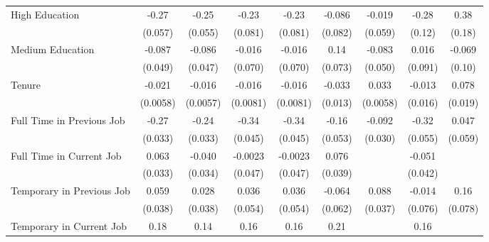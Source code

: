 {\begin{tabular}{l*{8}{c}}
High Education &   -0.27\sym{***}&   -0.25\sym{***}&   -0.23\sym{***}&   -0.23\sym{***}&  -0.086         &  -0.019         &   -0.28\sym{**} &    0.38\sym{**} \\
               & (0.057)         & (0.055)         & (0.081)         & (0.081)         & (0.082)         & (0.059)         &  (0.12)         &  (0.18)         \\
Medium Education&  -0.087\sym{*}  &  -0.086\sym{*}  &  -0.016         &  -0.016         &    0.14\sym{*}  &  -0.083\sym{*}  &   0.016         &  -0.069         \\
               & (0.049)         & (0.047)         & (0.070)         & (0.070)         & (0.073)         & (0.050)         & (0.091)         &  (0.10)         \\
Tenure         &  -0.021\sym{***}&  -0.016\sym{***}&  -0.016\sym{*}  &  -0.016\sym{*}  &  -0.033\sym{**} &   0.033\sym{***}&  -0.013         &   0.078\sym{***}\\
               &(0.0058)         &(0.0057)         &(0.0081)         &(0.0081)         & (0.013)         &(0.0058)         & (0.016)         & (0.019)         \\
Full Time in Previous Job&   -0.27\sym{***}&   -0.24\sym{***}&   -0.34\sym{***}&   -0.34\sym{***}&   -0.16\sym{***}&  -0.092\sym{***}&   -0.32\sym{***}&   0.047         \\
               & (0.033)         & (0.033)         & (0.045)         & (0.045)         & (0.053)         & (0.030)         & (0.055)         & (0.059)         \\
Full Time in Current Job&   0.063\sym{*}  &  -0.040         & -0.0023         & -0.0023         &   0.076\sym{*}  &                 &  -0.051         &                 \\
               & (0.033)         & (0.034)         & (0.047)         & (0.047)         & (0.039)         &                 & (0.042)         &                 \\
Temporary in Previous Job&   0.059         &   0.028         &   0.036         &   0.036         &  -0.064         &   0.088\sym{**} &  -0.014         &    0.16\sym{**} \\
               & (0.038)         & (0.038)         & (0.054)         & (0.054)         & (0.062)         & (0.037)         & (0.076)         & (0.078)         \\
Temporary in Current Job&    0.18\sym{***}&    0.14\sym{***}&    0.16\sym{***}&    0.16\sym{***}&    0.21\sym{***}&                 &    0.16\sym{***}&                 \\

\end{tabular}}
